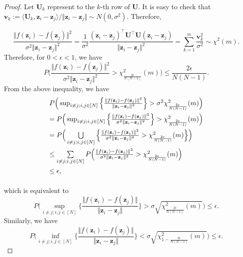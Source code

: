 \documentclass{article} \usepackage{iclr2021_conference,times}
\newcommand{\norms}[1]{\Vert#1\Vert}
\newcommand{\iprods}[1]{\langle #1\rangle}
\begin{document}
\begin{proof} 
	Let $\mathbf{U}_{k}$ represent to the $k$-th row of $\mathbf{U}$. It is easy to check that $\mathbf{v}_k := \iprods{\mathbf{U}_k, \mathbf{z}_i - \mathbf{z}_j}/\norms{\mathbf{z}_i - \mathbf{z}_j} \sim N(0, \sigma^2)$. Therefore,
	
	$$
	\frac{\norms{f(\mathbf{z}_i) - f(\mathbf{z}_j)}^2}{\sigma^2\norms{\mathbf{z}_i - \mathbf{z}_j}^2} = \frac{1}{\sigma^2 } \frac{(\mathbf{z}_i-\mathbf{z}_j)^{\top}\mathbf{U}^{\top}\mathbf{U}(\mathbf{z}_i-\mathbf{z}_j)}{\norms{\mathbf{z}_i - \mathbf{z}_j}^2} = \sum_{k = 1}^{ m} \frac{\mathbf{v}_k^2}{\sigma^2} \sim \chi^2(m).
	$$
	Therefore, for $0 < \epsilon < 1$, we have
	$$
	P\Big(\frac{\norms{f(\mathbf{z}_i) - f(\mathbf{z}_j)}^2}{\sigma^2\norms{\mathbf{z}_i - \mathbf{z}_j}^2} > \chi^2_{\frac{2\epsilon}{N(N-1)}}(m) \Big) \leq \frac{2\epsilon}{N(N-1)}.
	$$
	From the above inequality, we have
	$$
	\begin{array}{l}
	P\Big(\sup_{i\neq j; i,j  \in [N]}\Big\{ \frac{\norms{f(\mathbf{z}_i) - f(\mathbf{z}_j)}^2}{\norms{\mathbf{z}_i - \mathbf{z}_j}^2}\Big\} > \sigma^2\chi^2_{\frac{2\epsilon}{N(N-1)}}(m)\Big) \vspace{1ex}\\
	= P\Big(\sup_{i\neq j; i,j  \in [N]}\Big\{\frac{\norms{f(\mathbf{z}_i) - f(\mathbf{z}_j)}^2}{\sigma^2\norms{\mathbf{z}_i - \mathbf{z}_j}^2}\Big\} > \chi^2_{\frac{2\epsilon}{N(N-1)}}(m)\Big) \vspace{1ex}\\
	= P\Big(\bigcup\limits_{i\neq j; i,j  \in [N]}\Big\{\frac{\norms{f(\mathbf{z}_i) - f(\mathbf{z}_j)}^2}{\sigma^2\norms{\mathbf{z}_i - \mathbf{z}_j}^2} > \chi^2_{\frac{2\epsilon}{N(N-1)}}(m) \Big\}\Big) \vspace{1ex}\\
	\leq \sum\limits_{i\neq j; i,j  \in [N]} P\Big(\frac{\norms{f(\mathbf{z}_i) - f(\mathbf{z}_j)}^2}{\sigma^2\norms{\mathbf{z}_i - \mathbf{z}_j}^2} > \chi^2_{\frac{2\epsilon}{N(N-1)}}(m) \Big) \vspace{1ex}\\
	\leq \epsilon, \vspace{1ex}
	\end{array}
	$$
	
	which is equivalent to
	$$
	P\Big(\sup_{i\neq j; i,j  \in [N]}\Big\{\frac{\norms{f(\mathbf{z}_i) - f(\mathbf{z}_j)}}{\norms{\mathbf{z}_i - \mathbf{z}_j}}\Big\} > \sigma\sqrt{\chi^2_{\frac{2\epsilon}{N(N-1)}}(m)}\Big) \leq \epsilon.
	$$
	Similarly, we have
	$$
	P\Big(\inf_{i\neq j; i,j  \in [N]} \Big\{\frac{\norms{f(\mathbf{z}_i) - f(\mathbf{z}_j)}}{\norms{\mathbf{z}_i - \mathbf{z}_j}} \Big\} < \sigma\sqrt{\chi^2_{1 - \frac{2\epsilon}{N(N-1)}}(m)} \Big) \leq \epsilon.
	$$
	
\end{proof}
\end{document}
